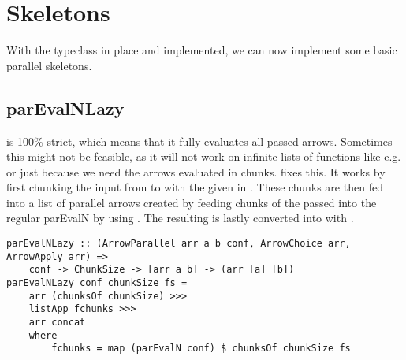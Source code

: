 \section{Skeletons}
With the  typeclass in place and implemented, we can now implement some basic parallel skeletons.

\subsection{parEvalNLazy}
 is 100\% strict, which means that it fully evaluates all passed arrows. Sometimes this might not be feasible, as it will not work on infinite lists of functions like e.g.  or just because we need the arrows evaluated in chunks.  fixes this. It works by first chunking the input from \code{[a]} to \code{[[a]]} with the given  in . These chunks are then fed into a list \code{[arr [a] [b]]} of parallel arrows created by feeding chunks of the passed  into the regular parEvalN by using . The resulting \code{[[b]]} is lastly converted into \code{[b]} with .
\begin{lstlisting}[frame=htrbl]
parEvalNLazy :: (ArrowParallel arr a b conf, ArrowChoice arr, ArrowApply arr) =>
	conf -> ChunkSize -> [arr a b] -> (arr [a] [b])
parEvalNLazy conf chunkSize fs =
	arr (chunksOf chunkSize) >>>
	listApp fchunks >>>
	arr concat
	where
		fchunks = map (parEvalN conf) $ chunksOf chunkSize fs
\end{lstlisting}

